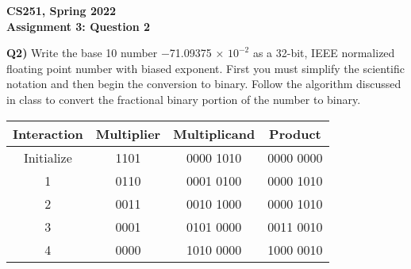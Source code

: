 \documentclass[12pt]{article}
\begin{document}
\begin{center}
{\Large\textbf{CS251, Spring 2022}}\\
\vspace{2mm}
{\Large\textbf{Assignment 3: Question 2}}\\
\vspace{3mm}
\end{center}
\textbf{Q2)} Write the base 10 number $-$71.09375 × $10^{-2}$ as a 32-bit, IEEE normalized floating point number with biased exponent. First you must simplify the scientific notation and then begin the conversion to binary. Follow the algorithm discussed in class to convert the fractional binary portion of the number to binary. \\

\begin{adjustwidth}{0em}{0pt}
\begin{center}
\begin{tabular}{|| c | c | c  |c ||} 
 \hline
 Interaction & Multiplier & Multiplicand & Product \\ [0.5ex] 
 \hline
 Initialize & 1101 & 0000 1010 & 0000 0000 \\ 
 \hline\hline
 1 & 0110 & 0001 0100 & 0000 1010  \\ 
 \hline
 2 & 0011 & 0010 1000 & 0000 1010 \\ 
 \hline
 3 & 0001 & 0101 0000 & 0011 0010 \\ 
 \hline
 4 & 0000 & 1010 0000 & 1000 0010 \\ 
 \hline
\end{tabular}
\end{center}
\end{adjustwidth}
\end{document}

